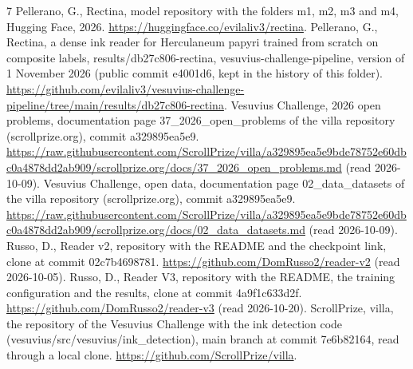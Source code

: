 \begin{thebibliography}{7}
 Pellerano, G., Rectina, model repository with the folders m1, m2, m3 and m4, Hugging Face, 2026. \url{https://huggingface.co/evilaliv3/rectina}.
 Pellerano, G., Rectina, a dense ink reader for Herculaneum papyri trained from scratch on composite labels, results/db27c806-rectina, vesuvius-challenge-pipeline, version of 1 November 2026 (public commit e4001d6, kept in the history of this folder). \url{https://github.com/evilaliv3/vesuvius-challenge-pipeline/tree/main/results/db27c806-rectina}.
 Vesuvius Challenge, 2026 open problems, documentation page 37\_2026\_open\_problems of the villa repository (scrollprize.org), commit a329895ea5e9. \url{https://raw.githubusercontent.com/ScrollPrize/villa/a329895ea5e9bde78752e60dbc0a4878dd2ab909/scrollprize.org/docs/37_2026_open_problems.md} (read 2026-10-09).
 Vesuvius Challenge, open data, documentation page 02\_data\_datasets of the villa repository (scrollprize.org), commit a329895ea5e9. \url{https://raw.githubusercontent.com/ScrollPrize/villa/a329895ea5e9bde78752e60dbc0a4878dd2ab909/scrollprize.org/docs/02_data_datasets.md} (read 2026-10-09).
 Russo, D., Reader v2, repository with the README and the checkpoint link, clone at commit 02c7b4698781. \url{https://github.com/DomRusso2/reader-v2} (read 2026-10-05).
 Russo, D., Reader V3, repository with the README, the training configuration and the results, clone at commit 4a9f1c633d2f. \url{https://github.com/DomRusso2/reader-v3} (read 2026-10-20).
 ScrollPrize, villa, the repository of the Vesuvius Challenge with the ink detection code (vesuvius/src/vesuvius/ink\_detection), main branch at commit 7e6b82164, read through a local clone. \url{https://github.com/ScrollPrize/villa}.
\end{thebibliography}
